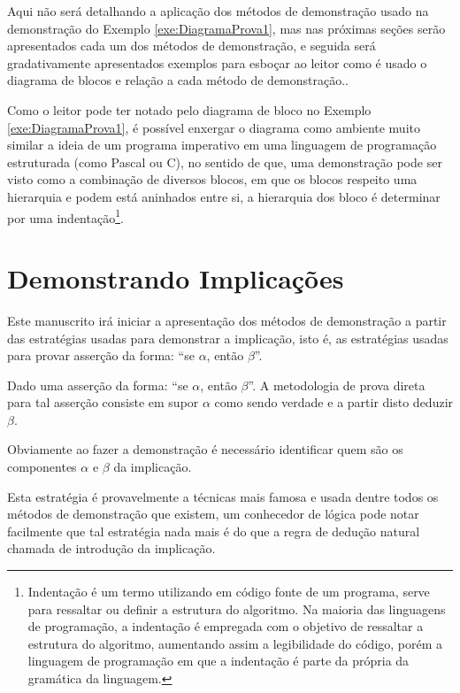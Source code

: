 Aqui não será detalhando a aplicação dos métodos de demonstração usado na demonstração do Exemplo \ref{exe:DiagramaProva1}, mas nas próximas seções serão apresentados cada um dos métodos de demonstração, e seguida será gradativamente apresentados exemplos para esboçar ao leitor como é usado o diagrama de blocos e relação a cada método de demonstração..

Como o leitor pode ter notado pelo diagrama de bloco no Exemplo \ref{exe:DiagramaProva1}, é possível enxergar o diagrama como ambiente muito similar a ideia de um programa imperativo em uma linguagem de programação estruturada (como Pascal ou C), no sentido de que, uma demonstração pode ser visto como a combinação de diversos blocos, em que os blocos respeito uma hierarquia e podem está aninhados entre si, a hierarquia dos bloco é determinar por uma indentação\footnote{Indentação é um termo utilizando em código fonte de um programa, serve para ressaltar ou definir a estrutura do algoritmo. Na maioria das linguagens de programação, a indentação é empregada com o objetivo de ressaltar a estrutura do algoritmo, aumentando assim a legibilidade do código, porém a linguagem de programação em que a indentação é parte da própria da gramática da linguagem.}. 

\section{Demonstrando Implicações}\label{sec:DemonstrandoImplicacoes}

Este manuscrito irá iniciar a apresentação dos métodos de demonstração a partir das estratégias usadas para demonstrar a implicação, isto é, as estratégias usadas para provar asserção da forma: ``se $\alpha$, então $\beta$''.

\begin{definition}
	Dado uma asserção da forma: ``se $\alpha$, então $\beta$''. A metodologia de prova direta para tal asserção consiste em supor $\alpha$ como sendo verdade e a partir disto deduzir $\beta$.
\end{definition}

\begin{remark}
	Obviamente ao fazer a demonstração é necessário identificar quem são os componentes $\alpha$ e $\beta$ da implicação.
\end{remark}

Esta estratégia é provavelmente a técnicas mais famosa e usada dentre todos os métodos de demonstração que existem, um conhecedor de lógica pode notar facilmente que tal estratégia nada mais é do que a regra de dedução natural chamada de introdução da implicação\cite{joaoPavao2014}. 

